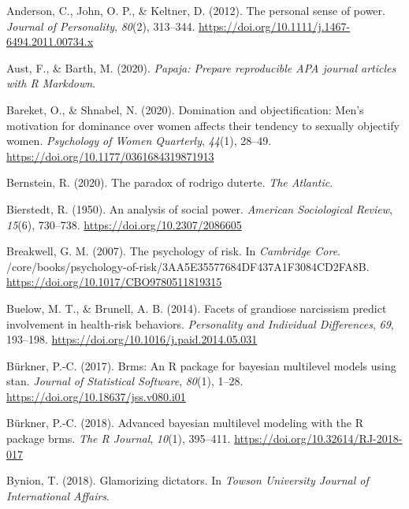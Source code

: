 \documentclass[
  donotrepeattitle,doc, 12pt, a4paper,floatsintext]{apa7}
\newlength{\cslhangindent}
\newlength{\cslentryspacingunit} %
\newenvironment{CSLReferences}[2] %
 {%
  \setlength{\parindent}{0pt}
  \ifodd #1
  \let\oldpar\par
  \def\par{\hangindent=\cslhangindent\oldpar}
  \fi
  \setlength{\parskip}{#2\cslentryspacingunit}
 }%
 {}
\begin{document}
\hypertarget{refs}{}
\begin{CSLReferences}{1}{0}
\leavevmode{}%
Anderson, C., John, O. P., \& Keltner, D. (2012). The personal sense of power. \emph{Journal of Personality}, \emph{80}(2), 313--344. \url{https://doi.org/10.1111/j.1467-6494.2011.00734.x}

\leavevmode{}%
Aust, F., \& Barth, M. (2020). \emph{Papaja: {Prepare} reproducible {APA} journal articles with {R Markdown}}.

\leavevmode{}%
Bareket, O., \& Shnabel, N. (2020). Domination and objectification: Men's motivation for dominance over women affects their tendency to sexually objectify women. \emph{Psychology of Women Quarterly}, \emph{44}(1), 28--49. \url{https://doi.org/10.1177/0361684319871913}

\leavevmode{}%
Bernstein, R. (2020). The paradox of rodrigo duterte. \emph{The Atlantic}.

\leavevmode{}%
Bierstedt, R. (1950). An analysis of social power. \emph{American Sociological Review}, \emph{15}(6), 730--738. \url{https://doi.org/10.2307/2086605}

\leavevmode{}%
Breakwell, G. M. (2007). The psychology of risk. In \emph{Cambridge Core}. /core/books/psychology-of-risk/3AA5E35577684DF437A1F3084CD2FA8B. \url{https://doi.org/10.1017/CBO9780511819315}

\leavevmode{}%
Buelow, M. T., \& Brunell, A. B. (2014). Facets of grandiose narcissism predict involvement in health-risk behaviors. \emph{Personality and Individual Differences}, \emph{69}, 193--198. \url{https://doi.org/10.1016/j.paid.2014.05.031}

\leavevmode{}%
Bürkner, P.-C. (2017). Brms: An {R} package for bayesian multilevel models using stan. \emph{Journal of Statistical Software}, \emph{80}(1), 1--28. \url{https://doi.org/10.18637/jss.v080.i01}

\leavevmode{}%
Bürkner, P.-C. (2018). Advanced bayesian multilevel modeling with the {R} package brms. \emph{The R Journal}, \emph{10}(1), 395--411. \url{https://doi.org/10.32614/RJ-2018-017}

\leavevmode{}%
Bynion, T. (2018). Glamorizing dictators. In \emph{Towson University Journal of International Affairs}.


\end{CSLReferences}
\end{document}
